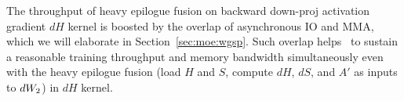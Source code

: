 The throughput of heavy epilogue fusion on backward down-proj activation gradient $dH$ kernel is boosted by the overlap of asynchronous IO and MMA, which we will elaborate in Section~\ref{sec:moe:wgsp}. Such overlap helps \Algname~to sustain a reasonable training throughput and memory bandwidth simultaneously even with the heavy epilogue fusion (load $H$ and $S$, compute $dH$, $dS$, and $A'$ as inputs to $dW_{2}$) in $dH$ kernel.

% 









